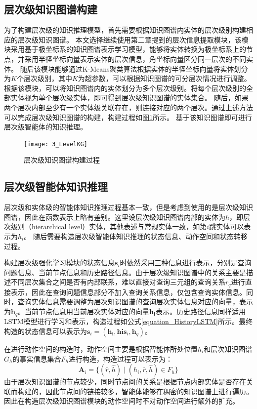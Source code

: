 \documentclass[algorithmlist, AutoFakeBold, AutoFakeSlant, figurelist, tablelist, nomlist, engineering]{seuthesix}
\begin{document}
\subsection{层次级知识图谱构建}
为了构建层次级的知识推理模型，首先需要根据知识图谱内实体的层次级别构建相应的层次级知识图谱。
本文选择继续使用第二章提到的层次信息提取模块，该模块采用基于极坐标系的知识图谱表示学习模型，能够将实体转换为极坐标系上的节点，并采用半径坐标向量表示实体的层次信息，角坐标向量区分同一层次的不同实体。
随后该模块能够通过K-Means聚类算法根据实体的半径坐标向量将实体划分为$K$个层次级别，其中$K$为超参数，可以根据知识图谱的可分层次情况进行调整。
根据该模块，可以将知识图谱内的实体划分为多个层次级别。将每个层次级别的全部实体视为单个层次级实体，即可得到层次级知识图谱的实体集合。
随后，如果两个层次内部至少有一个实体级关联存在，则连接对应的两个层次。通过上述方法可以完成层次级知识图谱的构建，构建过程如图\ref{3_LevelKG}所示。
基于该知识图谱即可进行层次级智能体的知识推理。
\begin{figure}
  \centering
  \texttt{[image: 3\_LevelKG]}
  \caption{层次级知识图谱构建过程}
  \label{3_LevelKG}
\end{figure}

\subsection{层次级智能体知识推理}
层次级和实体级的智能体知识推理过程基本一致，但是考虑到使用的是层次级知识图谱，因此在函数表示上略有差别。这里设层次级知识图谱内部的实体为$h$，即层次级别（hierarchical level）实体，其他表述与常规实体一致，如第$i$跳实体可以表示为$h_i$。
随后需要构造层次级智能体知识推理的状态信息、动作空间和状态转移过程。

构建层次级强化学习模块的状态信息$\bm{s}_i$时依然采用三种信息进行表示，分别是查询问题信息、当前节点信息和历史路径信息。由于层次级知识图谱中的关系主要是描述不同层次集合之间是否有内部联系，难以直接对查询三元组的查询关系$r_q$进行直接表示，因此在查询问题信息部分不加入查询关系信息，仅包含查询实体信息。同时，查询实体信息需要调整为层次知识图谱的查询层次实体信息对应的向量，表示为$\bm{h}_q$。当前节点信息用当前层次实体对应的向量$\bm{h_i}$表示。历史路径信息同样适用LSTM模型进行学习和表示，构造过程如公式\ref{equation_HistoryLSTM}所示。最终构造的状态信息可以表示为$\bm{s}_i = (\bm{h_i}, \bm{his}_i, \bm{h}_q)$。

在进行动作空间的构造时，动作空间主要是根据智能体所处位置$h_i$和层次知识图谱$G_h$的事实信息集合$F_h$进行构造，构造过程可以表示为：
\begin{equation}
  \bm{A}_i = \{(\hat{r}, \hat{h}) \mid (h_i, \hat{r}, \hat{h}) \in F_h\}
  \label{base_2}
\end{equation}
由于层次知识图谱的节点较少，同时节点间的关系是根据节点内部实体是否存在关联而构建的，因此节点间的链接较多，智能体能够在稠密的知识图谱上进行遍历。因此在构造层次级知识图谱模块的动作空间时不对动作空间进行额外的扩充。
\end{document}
